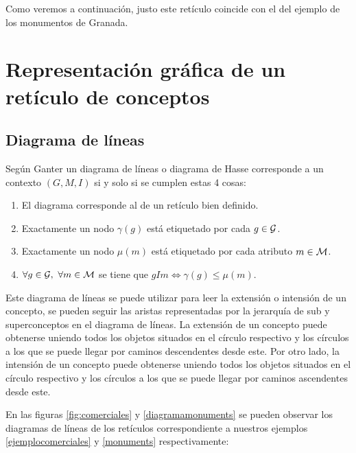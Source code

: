 \documentclass[oneside,openright,titlepage,numbers=noenddot,openany,headinclude,footinclude=true,
cleardoublepage=empty,abstractoff,BCOR=5mm,paper=a4,fontsize=12pt,main=spanish]{scrreprt}
\begin{document}
Como veremos a continuación, justo este retículo coincide con el del ejemplo de los monumentos de Granada.
    


\section{Representación gráfica de un retículo de conceptos}

\subsection{Diagrama de líneas} 

Según Ganter \cite{ganter_formal_1999} un diagrama de líneas o diagrama de Hasse corresponde a un contexto $(G,M,I) $ si y solo si se cumplen estas 4 cosas:

\begin{enumerate}
    \item El diagrama corresponde al de un retículo bien definido.
    \item Exactamente un nodo $\gamma(g)$ está etiquetado por cada $g \in \mathcal{G}$.
    \item Exactamente un nodo $\mu(m)$ está etiquetado por cada atributo $ m \in \mathcal{M}$.
    \item   $\forall g \in \mathcal{G}, \ \forall m \in \mathcal{M} $ se tiene que $gIm \Longleftrightarrow \gamma(g) \leq \mu(m)$.
\end{enumerate}


Este diagrama de líneas se puede utilizar para leer la extensión o intensión de un concepto, se pueden seguir las aristas representadas por la jerarquía de sub y superconceptos en el diagrama de líneas. La extensión de un concepto puede obtenerse uniendo todos los objetos situados en el círculo respectivo y los círculos a los que se puede llegar por caminos descendentes desde este. Por otro lado, la intensión de un concepto puede obtenerse uniendo todos los objetos situados en el círculo respectivo y los círculos a los que se puede llegar por caminos ascendentes desde este.

En las figuras \ref{fig:comerciales} y \ref{diagramamonuments} se pueden observar los diagramas de líneas de los retículos correspondiente a nuestros ejemplos \ref{ejemplocomerciales} y \ref{monuments} respectivamente: 
\end{document}
